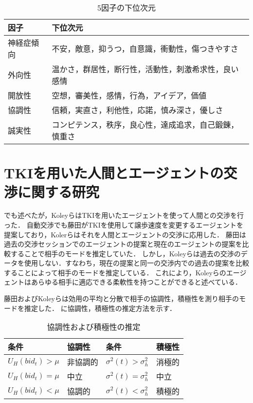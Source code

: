 \begin{table}[htb]
    \centering
    \caption{5因子の下位次元 \protect \footnotemark}
    \begin{tabular}{ll} \toprule
        因子 & 下位次元 \\ \midrule
        神経症傾向 & 不安，敵意，抑うつ，自意識，衝動性，傷つきやすさ \\
        外向性 & 温かさ，群居性，断行性，活動性，刺激希求性，良い感情 \\
        開放性 & 空想，審美性，感情，行為，アイデア，価値 \\
        協調性 & 信頼，実直さ，利他性，応諾，慎み深さ，優しさ \\
        誠実性 & コンピテンス，秩序，良心性，達成追求，自己鍛錬，慎重さ \\ \bottomrule
    \end{tabular}
    \label{tab:neo-pi-r}
\end{table}

\section{TKIを用いた人間とエージェントの交渉に関する研究}
でも述べたが，Koleyら\cite{tki-ha}はTKIを用いたエージェントを使って人間との交渉を行った．
自動交渉でも藤田\cite{tki-aa}がTKIを使用して譲歩速度を変更するエージェントを提案しており，Kolerらはそれを人間とエージェントの交渉に応用した．
藤田は過去の交渉セッションでのエージェントの提案と現在のエージェントの提案を比較することで相手のモードを推定していた．
しかし，Koleyらは過去の交渉のデータを使用しない．すなわち，現在の提案と同一の交渉内での過去の提案を比較することによって相手のモードを推定している．
これにより，Koleyらのエージェントはあらゆる相手に適応できる柔軟性を持つことができると述べている．

藤田およびKoleyらは効用の平均と分散で相手の協調性，積極性を測り相手のモードを推定した．
に協調性，積極性の推定方法を示す．

\begin{table}[htb]
    \centering
    \caption{協調性および積極性の推定 \protect \footnotemark}
    \begin{tabular}{llll} \toprule
        条件 & 協調性 & 条件 & 積極性 \\ \midrule
        $U_H(bid_t)>\mu$ & 非協調的 & $\sigma^2(t)>\sigma^2_h$ & 消極的 \\
        $U_H(bid_t)=\mu$ & 中立 & $\sigma^2(t)=\sigma^2_h$ & 中立 \\
        $U_H(bid_t)<\mu$ & 協調的 & $\sigma^2(t)<\sigma^2_h$ & 積極的\\ \bottomrule
    \end{tabular}
    \label{tab:tki-metrics}
\end{table}

